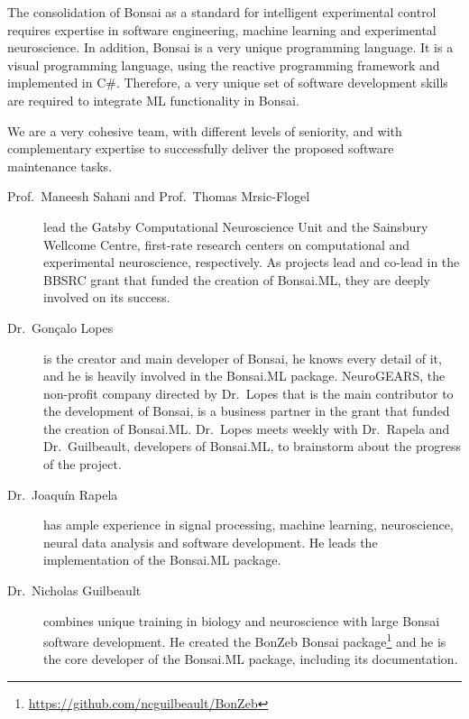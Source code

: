 The consolidation of Bonsai as a standard for intelligent experimental control
requires expertise in software engineering, machine learning and experimental
neuroscience.
%
In addition, Bonsai is a very unique programming language. It is a visual
programming language, using the reactive programming framework and implemented
in C\#.
%
Therefore, a very unique set of software development skills are required to
integrate ML functionality in Bonsai.

We are a very cohesive team, with different levels of seniority, and with
complementary expertise to successfully deliver the proposed software
maintenance tasks.

\begin{description}

    \item[Prof.~Maneesh Sahani and Prof.~Thomas Mrsic-Flogel] lead the Gatsby
        Computational Neuroscience Unit and the Sainsbury Wellcome Centre,
        first-rate research centers on computational and experimental
        neuroscience, respectively. As projects lead and co-lead in the BBSRC
        grant that funded the creation of Bonsai.ML, they are deeply involved
        on its success.

    \item[Dr.~Gonçalo Lopes] is the creator and main developer of Bonsai, he
        knows every detail of it, and he is heavily involved in the Bonsai.ML
        package.
        NeuroGEARS, the non-profit company directed by Dr.~Lopes that is the
        main contributor to the development of Bonsai, is a business partner in
        the grant that funded the creation of Bonsai.ML.
        Dr.~Lopes meets weekly with Dr.~Rapela and Dr.~Guilbeault, developers
        of Bonsai.ML, to brainstorm about the progress of the project.

    \item[Dr.~Joaquín Rapela] has ample experience in signal processing,
        machine learning, neuroscience, neural data analysis and software
        development. He leads the implementation of the Bonsai.ML package.

    \item[Dr.~Nicholas Guilbeault] combines unique training in biology and
        neuroscience with large Bonsai software development. He created the
        BonZeb Bonsai
        package\footnote{\url{https://github.com/ncguilbeault/BonZeb}} and he
        is the core developer of the Bonsai.ML package, including its
        documentation.

\end{description}

